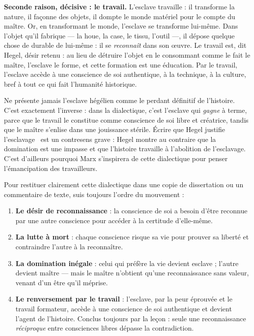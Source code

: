\documentclass[11pt]{article}
\begin{document}
\textbf{Seconde raison, décisive : le travail.} L'esclave travaille : il transforme la nature, il façonne des objets, il dompte le monde matériel pour le compte du maître. Or, en transformant le monde, l'esclave se transforme lui-même. Dans l'objet qu'il fabrique — la houe, la case, le tissu, l'outil —, il dépose quelque chose de durable de lui-même : il se \emph{reconnaît} dans son œuvre. Le travail est, dit Hegel, \guillemotleft désir retenu \guillemotright : au lieu de détruire l'objet en le consommant comme le fait le maître, l'esclave le forme, et cette formation est une éducation. Par le travail, l'esclave accède à une conscience de soi authentique, à la technique, à la culture, bref à tout ce qui fait l'humanité historique.

\begin{attention}
Ne présente jamais l'esclave hégélien comme le perdant définitif de l'histoire. C'est exactement l'inverse : dans la dialectique, c'est l'esclave qui \emph{gagne} à terme, parce que le travail le constitue comme conscience de soi libre et créatrice, tandis que le maître s'enlise dans une jouissance stérile. Écrire que \guillemotleft Hegel justifie l'esclavage \guillemotright\ est un contresens grave : Hegel montre au contraire que la domination est une impasse et que l'histoire travaille à l'abolition de l'esclavage. C'est d'ailleurs pourquoi Marx s'inspirera de cette dialectique pour penser l'émancipation des travailleurs.
\end{attention}

\begin{methode}
Pour restituer clairement cette dialectique dans une copie de dissertation ou un commentaire de texte, suis toujours l'ordre du mouvement :
\begin{enumerate}
\item \textbf{Le désir de reconnaissance} : la conscience de soi a besoin d'être reconnue par une autre conscience pour accéder à la certitude d'elle-même.
\item \textbf{La lutte à mort} : chaque conscience risque sa vie pour prouver sa liberté et contraindre l'autre à la reconnaître.
\item \textbf{La domination inégale} : celui qui préfère la vie devient esclave ; l'autre devient maître — mais le maître n'obtient qu'une reconnaissance sans valeur, venant d'un être qu'il méprise.
\item \textbf{Le renversement par le travail} : l'esclave, par la peur éprouvée et le travail formateur, accède à une conscience de soi authentique et devient l'agent de l'histoire.
Conclus toujours par la leçon : seule une reconnaissance \emph{réciproque} entre consciences libres dépasse la contradiction.
\end{enumerate}
\end{methode}
\end{document}
